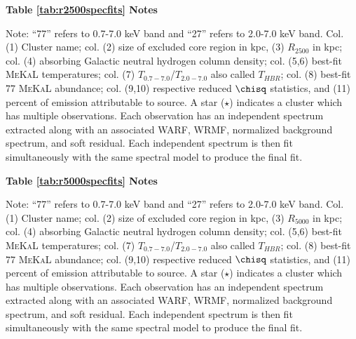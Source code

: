 \begin{center}
{\bf{Table \ref{tab:r2500specfits} Notes}}\\
\end{center}
Note: ``77'' refers to 0.7-7.0 keV band and ``27'' refers to 2.0-7.0
keV band. Col. (1) Cluster name; col. (2) size of excluded core region
in kpc, (3) $R_{2500}$ in kpc; col. (4) absorbing Galactic neutral
hydrogen column density; col. (5,6) best-fit {\textsc{MeKaL}}
temperatures; col. (7) $T_{0.7-7.0}$/$T_{2.0-7.0}$ also called
$T_{HBR}$; col. (8) best-fit 77 {\textsc{MeKaL}} abundance;
col. (9,10) respective reduced $\chisq$ statistics, and (11) percent
of emission attributable to source. A star ($\star$) indicates a
cluster which has multiple observations. Each observation has an
independent spectrum extracted along with an associated WARF, WRMF,
normalized background spectrum, and soft residual. Each independent
spectrum is then fit simultaneously with the same spectral model to
produce the final fit.

\begin{center}
{\bf{Table \ref{tab:r5000specfits} Notes}}\\
\end{center}
Note: ``77'' refers to 0.7-7.0 keV band and ``27'' refers to 2.0-7.0
keV band. Col. (1) Cluster name; col. (2) size of excluded core region
in kpc, (3) $R_{5000}$ in kpc; col. (4) absorbing Galactic neutral
hydrogen column density; col. (5,6) best-fit {\textsc{MeKaL}}
temperatures; col. (7) $T_{0.7-7.0}$/$T_{2.0-7.0}$ also called
$T_{HBR}$; col. (8) best-fit 77 {\textsc{MeKaL}} abundance;
col. (9,10) respective reduced $\chisq$ statistics, and (11) percent
of emission attributable to source. A star ($\star$) indicates a
cluster which has multiple observations. Each observation has an
independent spectrum extracted along with an associated WARF, WRMF,
normalized background spectrum, and soft residual. Each independent
spectrum is then fit simultaneously with the same spectral model to
produce the final fit.
